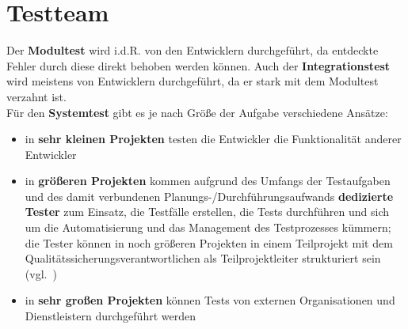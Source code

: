 \section{Testteam}
Der \textbf{Modultest} wird i.d.R. von den Entwicklern durchgeführt, da entdeckte Fehler durch diese direkt behoben werden können.
Auch der \textbf{Integrationstest} wird meistens von Entwicklern durchgeführt, da er stark mit dem Modultest verzahnt ist.\\

\noindent
Für den \textbf{Systemtest} gibt es je nach Größe der Aufgabe verschiedene Ansätze:

\begin{itemize}
    \item in \textbf{sehr kleinen Projekten} testen die Entwickler die Funktionalität anderer Entwickler
    \item in \textbf{größeren Projekten} kommen aufgrund des Umfangs der Testaufgaben und des damit verbundenen Planungs-/Durchführungsaufwands \textbf{dedizierte Tester} zum Einsatz, die Testfälle erstellen, die Tests durchführen und sich um die Automatisierung und das Management des Testprozesses kümmern; die Tester können in noch größeren Projekten in einem Teilprojekt mit dem Qualitätssicherungsverantwortlichen als Teilprojektleiter strukturiert sein (vgl.~\cite[71]{Wed09c})
    \item in \textbf{sehr großen Projekten} können Tests von externen Organisationen und Dienstleistern durchgeführt werden
\end{itemize}
